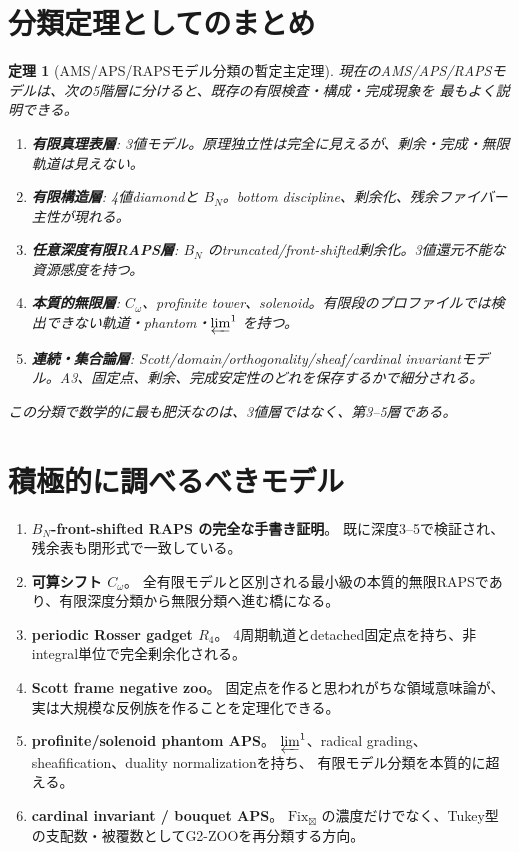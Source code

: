 \documentclass[uplatex,dvipdfmx,a4paper,10pt]{jsarticle}
\newtheorem{theorem}{定理}
\newcommand{\Fix}{\mathrm{Fix}}
\newcommand{\bt}{\boxtimes}
\begin{document}
\section{分類定理としてのまとめ}

\begin{theorem}[AMS/APS/RAPSモデル分類の暫定主定理]
現在のAMS/APS/RAPSモデルは、次の5階層に分けると、既存の有限検査・構成・完成現象を
最もよく説明できる。
\begin{enumerate}
  \item \textbf{有限真理表層}: 3値モデル。原理独立性は完全に見えるが、剰余・完成・無限軌道は見えない。
  \item \textbf{有限構造層}: 4値diamondと \(B_N\)。bottom discipline、剰余化、残余ファイバー主性が現れる。
  \item \textbf{任意深度有限RAPS層}: \(B_N\) のtruncated/front-shifted剰余化。3値還元不能な資源感度を持つ。
  \item \textbf{本質的無限層}: \(C_\omega\)、profinite tower、solenoid。有限段のプロファイルでは検出できない軌道・phantom・\(\varprojlim^1\) を持つ。
  \item \textbf{連続・集合論層}: Scott/domain/orthogonality/sheaf/cardinal invariantモデル。A3、固定点、剰余、完成安定性のどれを保存するかで細分される。
\end{enumerate}
この分類で数学的に最も肥沃なのは、3値層ではなく、第3--5層である。
\end{theorem}

\section{積極的に調べるべきモデル}

\begin{enumerate}
  \item \textbf{\(B_N\)-front-shifted RAPS の完全な手書き証明}。
  既に深度3--5で検証され、残余表も閉形式で一致している。
  \item \textbf{可算シフト \(C_\omega\)}。
  全有限モデルと区別される最小級の本質的無限RAPSであり、有限深度分類から無限分類へ進む橋になる。
  \item \textbf{periodic Rosser gadget \(R_4\)}。
  4周期軌道とdetached固定点を持ち、非integral単位で完全剰余化される。
  \item \textbf{Scott frame negative zoo}。
  固定点を作ると思われがちな領域意味論が、実は大規模な反例族を作ることを定理化できる。
  \item \textbf{profinite/solenoid phantom APS}。
  \(\varprojlim^1\)、radical grading、sheafification、duality normalizationを持ち、
  有限モデル分類を本質的に超える。
  \item \textbf{cardinal invariant / bouquet APS}。
  \(\Fix_{\bt}\) の濃度だけでなく、Tukey型の支配数・被覆数としてG2-ZOOを再分類する方向。
\end{enumerate}
\end{document}
